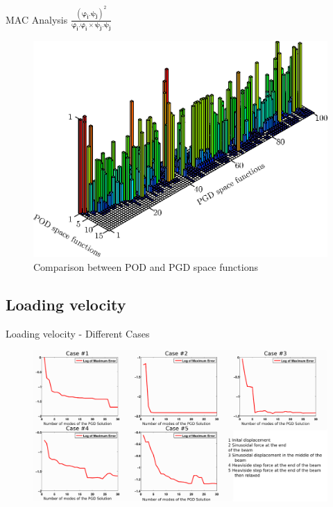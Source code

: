 \documentclass[10pt,a4paper]{beamer}
\begin{document}
\begin{frame}{MAC Analysis
	$\frac{\left(\boldsymbol{\varphi_i.\psi_j}\right)^2}{\boldsymbol{\varphi_i.\varphi_i \times \psi_j.\psi_j}}$} 
	\begin{figure}
	\includegraphics[width=0.7\linewidth]{MAC.POD.PGD.eps}
	\caption{Comparison between POD and PGD space functions}
	\end{figure}
\end{frame}

\subsection{Loading velocity}

\begin{frame}{Loading velocity - Different Cases} 
	\begin{figure}
	\includegraphics[width=0.98\linewidth]{Cases2.eps}
	\end{figure}
\end{frame}
\end{document}
